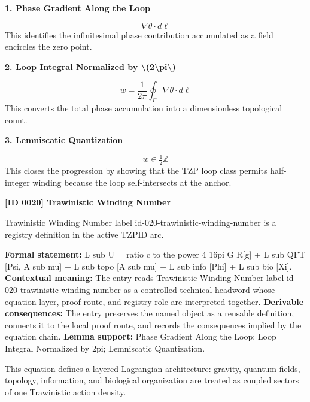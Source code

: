 \noindent\textbf{1. Phase Gradient Along the Loop}\par
\[
\nabla \theta \cdot d\ell
\]
\noindent This identifies the infinitesimal phase contribution accumulated as a field encircles the zero point.\par
\noindent\textbf{2. Loop Integral Normalized by \textbackslash{}(2\textbackslash{}pi\textbackslash{})}\par
\[
w
=
\frac{1}{2\pi}
\oint_{\Gamma}
\nabla \theta \cdot d\ell
\]
\noindent This converts the total phase accumulation into a dimensionless topological count.\par
\noindent\textbf{3. Lemniscatic Quantization}\par
\[
w \in \tfrac{1}{2}\mathbb{Z}
\]
\noindent This closes the progression by showing that the TZP loop class permits half-integer winding because the loop self-intersects at the anchor.\par

\clearpage
\noindent\textbf{[ID 0020] Trawinistic Winding Number}\par
\vspace{0.35em}
\begingroup\small
{}
Trawinistic Winding Number label id-020-trawinistic-winding-number is a registry definition in the active TZPID arc.

\begingroup\footnotesize\setlength{\emergencystretch}{3em}\sloppy
\textbf{Formal statement:} L sub U = ratio c to the power 4 16pi G R[g] + L sub QFT [Psi, A sub mu] + L sub topo [A sub mu] + L sub info [Phi] + L sub bio [Xi]. \textbf{Contextual meaning:} The entry reads Trawinistic Winding Number label id-020-trawinistic-winding-number as a controlled technical headword whose equation layer, proof route, and registry role are interpreted together. \textbf{Derivable consequences:} The entry preserves the named object as a reusable definition, connects it to the local proof route, and records the consequences implied by the equation chain. \textbf{Lemma support:} Phase Gradient Along the Loop; Loop Integral Normalized by 2pi; Lemniscatic Quantization.\par
\endgroup

This equation defines a layered Lagrangian architecture: gravity, quantum fields, topology, information, and biological organization are treated as coupled sectors of one Trawinistic action density.

